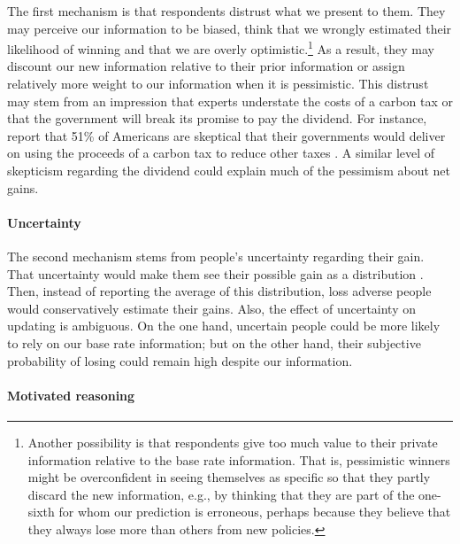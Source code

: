 \documentclass[12pt]{article} %
\begin{document}
The first mechanism is that respondents distrust what we present to them. They may perceive our information to be biased, think that we wrongly estimated their likelihood of winning and that we are overly optimistic.\footnote{Another possibility is that respondents give too much value to their private information relative to the base rate information. That is, pessimistic winners might be overconfident in seeing themselves as specific so that they partly discard the new information, e.g., by thinking that they are part of the one-sixth for whom our prediction is erroneous, perhaps because they believe that they always lose more than others from new policies.} As a result, they may discount our new information relative to their prior information or assign relatively more weight to our information when it is pessimistic. This distrust may stem from an impression that experts understate the costs of a carbon tax or that the government will break its promise to pay the dividend. For instance, \cite{sapienza_zingales_2013} report that 51\% of Americans are skeptical that their governments would deliver on using the proceeds of a carbon tax to reduce other taxes \citep[see also][]{dresner_social_2006,hsu_pollution_2008}. A similar level of skepticism regarding the dividend could explain much of the pessimism about net gains.

\paragraph{Uncertainty}

The second mechanism stems from people's uncertainty regarding their gain. That uncertainty would make them see their possible gain as a distribution \citep[see][]{stiglitz_addressing_2019}. Then, instead of reporting the average of this distribution, loss adverse people would conservatively estimate their gains. Also, the effect of uncertainty on updating is ambiguous. On the one hand, uncertain people could be more likely to rely on our base rate information; but on the other hand, their subjective probability of losing could remain high despite our information.%


\paragraph{Motivated reasoning}
\end{document}
